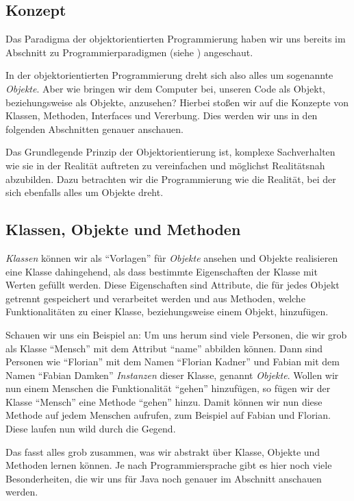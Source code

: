 
\subsection{Konzept}
	Das Paradigma der objektorientierten Programmierung haben wir uns bereits im Abschnitt zu Programmierparadigmen (siehe ) angeschaut.
	
	In der objektorientierten Programmierung dreht sich also alles um sogenannte \textit{Objekte}. Aber wie bringen wir dem Computer bei, unseren Code als Objekt, beziehungsweise als Objekte, anzusehen? Hierbei stoßen wir auf die Konzepte von Klassen, Methoden, Interfaces und Vererbung. Dies werden wir uns in den folgenden Abschnitten genauer anschauen.
	
	Das Grundlegende Prinzip der Objektorientierung ist, komplexe Sachverhalten wie sie in der Realität auftreten zu vereinfachen und möglichst Realitätsnah abzubilden. Dazu betrachten wir die Programmierung wie die Realität, bei der sich ebenfalls alles um Objekte dreht.

\subsection{Klassen, Objekte und Methoden} \imperativeMark \oopMark
	
	\textit{Klassen} können wir als \enquote{Vorlagen} für \textit{Objekte} ansehen und Objekte realisieren eine Klasse dahingehend, als dass bestimmte Eigenschaften der Klasse mit Werten gefüllt werden. Diese Eigenschaften sind Attribute, die für jedes Objekt getrennt gespeichert und verarbeitet werden und aus Methoden, welche Funktionalitäten zu einer Klasse, beziehungsweise einem Objekt, hinzufügen.
	
	Schauen wir uns ein Beispiel an: Um uns herum sind viele Personen, die wir grob als Klasse \enquote{Mensch} mit dem Attribut \enquote{name} abbilden können. Dann sind Personen wie \enquote{Florian} mit dem Namen \enquote{Florian Kadner} und Fabian mit dem Namen \enquote{Fabian Damken} \textit{Instanzen} dieser Klasse, genannt \textit{Objekte}. Wollen wir nun einem Menschen die Funktionalität \enquote{gehen} hinzufügen, so fügen wir der Klasse \enquote{Mensch} eine Methode \enquote{gehen} hinzu. Damit können wir nun diese Methode auf jedem Menschen aufrufen, zum Beispiel auf Fabian und Florian. Diese laufen nun wild durch die Gegend.
	
	Das fasst alles grob zusammen, was wir abstrakt über Klasse, Objekte und Methoden lernen können. Je nach Programmiersprache gibt es hier noch viele Besonderheiten, die wir uns für Java noch genauer im Abschnitt  anschauen werden.
	
